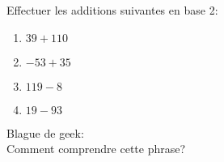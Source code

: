 \documentclass[a4paper,11pt]{article}
\begin{document}
\begin{Form}
\begin{exo}
Effectuer les additions suivantes en base 2:
\begin{enumerate}
\item $39+110$
\item $-53+35$
\item $119-8$
\item $19-93$
\end{enumerate}
\end{exo}
\begin{exo}
Blague de geek:\\
Comment comprendre cette phrase?
\end{exo}
\end{Form}
\end{document}
